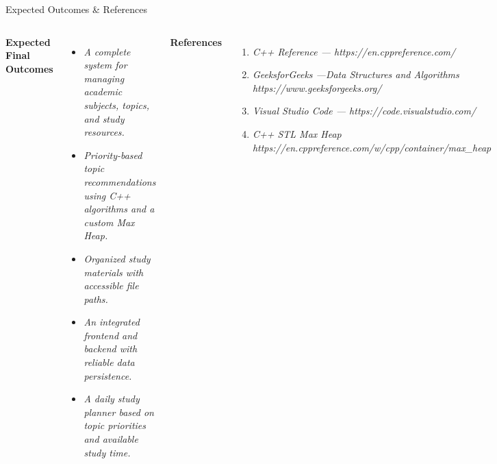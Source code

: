 \documentclass[aspectratio=169,11pt]{beamer}
\newcommand{\placeholder}[1]{%
\textit{\color{GEUGrey}#1}
}
\begin{document}
\begin{frame}{Expected Outcomes \& References}
\vspace{-0.8cm}
\begin{columns}[T,totalwidth=\textwidth]


\textbf{\color{GEUBlue}Expected Final Outcomes}

\begin{itemize}\itemsep3pt
\item \placeholder{A complete system for managing academic subjects, topics, and study resources.}
\item \placeholder{Priority-based topic recommendations using C++ algorithms and a custom Max Heap.}
\item \placeholder{Organized study materials with accessible file paths.}


\item \placeholder{An integrated frontend and backend with reliable data persistence.}
\item \placeholder{A daily study planner based on topic priorities and available study time.}
\end{itemize}


\textbf{\color{GEUBlue}References}

\begin{enumerate}\itemsep3pt
\item \placeholder{C++ Reference — https://en.cppreference.com/}
\item \placeholder{GeeksforGeeks —Data Structures and Algorithms https://www.geeksforgeeks.org/}
\item \placeholder{Visual Studio Code — https://code.visualstudio.com/}
\item \placeholder{C++ STL Max Heap https://en.cppreference.com/w/cpp/container/max_heap}

\end{enumerate}

\vfill

\begin{center}



\end{center}

\end{columns}

\vfill



\end{frame}
\end{document}
